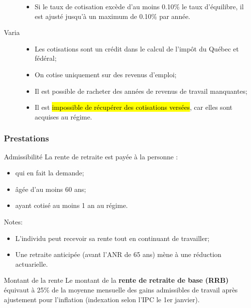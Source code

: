 \documentclass[10pt, french]{article}
\begin{document}
\begin{multicols*}{3}
\begin{description}
		\begin{itemize}[leftmargin = *]
		\item	Si le taux de cotisation excède d'au moins 0.10\% le taux d'équilibre, il est ajusté jusqu'à un maximum de 0.10\% par année.
		\end{itemize}
	\item[Varia]
		\begin{itemize}[leftmargin = *]
			\item	Les cotisations sont un crédit dans le calcul de l'impôt du \textcolor{blue(pigment)}{Québec} et \textcolor{bulgarianrose}{fédéral};
			\item	On cotise uniquement sur des revenus d'emploi;
			\item	Il est possible de racheter des années de revenus de travail manquantes;
			\item	Il est \hl{impossible de récupérer des cotisations versées}, car elles sont acquises au régime.
		\end{itemize}
\end{description}

\columnbreak

\subsubsection*{Prestations}

\begin{conceptgen}{Admissibilité}
La rente de retraite est payée à la personne :
\begin{itemize}[leftmargin = *]
	\item	qui en fait la demande;
	\item	âgée d'au moins 60 ans;
	\item	ayant cotisé au moins 1 an au régime.
\end{itemize}
\tcbline
Notes:
\begin{itemize}[leftmargin = *]
	\item	L'individu peut recevoir sa rente tout en continuant de travailler;
	\item	Une retraite anticipée (avant l'ANR de 65 ans) mène à une réduction actuarielle.
\end{itemize}
\end{conceptgen}

\begin{conceptgen}{Montant de la rente}
Le montant de la \textbf{rente de retraite de base (RRB)} équivaut à 25\% de la moyenne mensuelle des gains admissibles de travail après ajustement pour l'inflation (indexation selon l'IPC le 1er janvier).
\end{conceptgen}


\end{multicols*}
\end{document}
